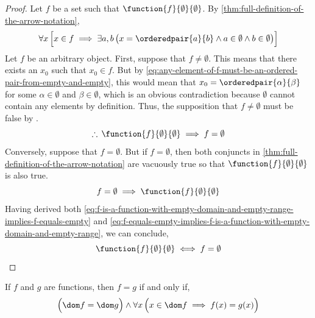 \begin{proof}
    Let \( f \) be a set such that \( \function{f}{\emptyset}{\emptyset} \). By \cref{thm:full-definition-of-the-arrow-notation},
    \begin{equation}
        \label{eq:any-element-of-f-must-be-an-ordered-pair-from-empty-and-empty}
        \forall x \, \Big[ x \in f \implies \exists a,b \, \big( x = \orderedpair{a}{b} \land a \in \emptyset \land b \in \emptyset \big) \Big]
    \end{equation}
    Let \( f \) be an arbitrary object.
    First, suppose that \( f \neq \emptyset \). This means that there exists an \( x_{0} \) such that \( x_{0} \in f \).
    But by \eqref{eq:any-element-of-f-must-be-an-ordered-pair-from-empty-and-empty}, this would mean that \( x_{0} = \orderedpair{\alpha}{\beta} \)
    for some \( \alpha \in \emptyset \) and \( \beta \in \emptyset \), which is an obvious contradiction because \( \emptyset \) cannot contain
    any elements by definition. Thus, the supposition that \( f \neq \emptyset \) must be false by .
    \begin{equation}
        \label{eq:f-is-a-function-with-empty-domain-and-empty-range-implies-f-equals-empty}
        \therefore \, \function{f}{\emptyset}{\emptyset} \implies f = \emptyset
    \end{equation}
    Conversely, suppose that \( f = \emptyset \). But if \( f = \emptyset \), then both conjuncts in \cref{thm:full-definition-of-the-arrow-notation}
    are vacuously true so that \( \function{f}{\emptyset}{\emptyset} \) is also true.
    \begin{equation}
        \label{eq:f-equals-empty-implies-f-is-a-function-with-empty-domain-and-empty-range}
        f = \emptyset \implies \function{f}{\emptyset}{\emptyset}
    \end{equation}
    Having derived both \eqref{eq:f-is-a-function-with-empty-domain-and-empty-range-implies-f-equals-empty} and
    \eqref{eq:f-equals-empty-implies-f-is-a-function-with-empty-domain-and-empty-range}, we can conclude,
    \begin{equation*}
        \function{f}{\emptyset}{\emptyset} \iff f = \emptyset \qedhere
    \end{equation*}
\end{proof}

\begin{thm}[Equality]
    \label{thm:equality-of-functions}
    If \( f \) and \( g \) are functions, then \( f = g \) if and only if,
    \begin{equation*}
        \Big( \dom f = \dom g \Big) \land \forall x \, \Big( x \in \dom f \implies f(x) = g(x) \Big)
    \end{equation*}
\end{thm}

